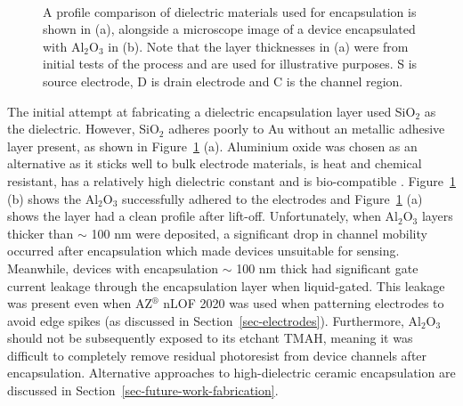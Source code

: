 \documentclass[
  a4paper,
]{scrbook}
\begin{document}
\begin{figure}
\begin{minipage}[t]{0.42\linewidth}
{{}

}

\end{minipage}%
%
\begin{minipage}[t]{0.01\linewidth}

{\centering 

~

}

\end{minipage}%

\caption[A profile comparison of dielectric materials used for
encapsulation, alongside a microscope image of a device encapsulated
with alumina.]{\label{fig-dektat-dielectric-layer}A profile comparison
of dielectric materials used for encapsulation is shown in (a),
alongside a microscope image of a device encapsulated with
Al\(_2\)O\(_3\) in (b). Note that the layer thicknesses in (a) were from
initial tests of the process and are used for illustrative purposes. S
is source electrode, D is drain electrode and C is the channel region.}

\end{figure}

The initial attempt at fabricating a dielectric encapsulation layer used
SiO\(_2\) as the dielectric. However, SiO\(_2\) adheres poorly to Au
without an metallic adhesive layer present, as shown in
Figure~\ref{fig-dektat-dielectric-layer} (a). Aluminium oxide was chosen
as an alternative as it sticks well to bulk electrode materials, is heat
and chemical resistant, has a relatively high dielectric constant and is
bio-compatible \autocite{Guarnieri2014,Albarghouthi2022,Kolodzey2000}.
Figure~\ref{fig-dektat-dielectric-layer} (b) shows the Al\(_2\)O\(_3\)
successfully adhered to the electrodes and
Figure~\ref{fig-dektat-dielectric-layer} (a) shows the layer had a clean
profile after lift-off. Unfortunately, when Al\(_2\)O\(_3\) layers
thicker than \(\sim\) 100 nm were deposited, a significant drop in
channel mobility occurred after encapsulation which made devices
unsuitable for sensing. Meanwhile, devices with encapsulation \(\sim\)
100 nm thick had significant gate current leakage through the
encapsulation layer when liquid-gated. This leakage was present even
when AZ\(^\circledR\) nLOF 2020 was used when patterning electrodes to
avoid edge spikes (as discussed in Section~\ref{sec-electrodes}).
Furthermore, Al\(_2\)O\(_3\) should not be subsequently exposed to its
etchant TMAH, meaning it was difficult to completely remove residual
photoresist from device channels after encapsulation. Alternative
approaches to high-dielectric ceramic encapsulation are discussed in
Section~\ref{sec-future-work-fabrication}.
\end{document}
